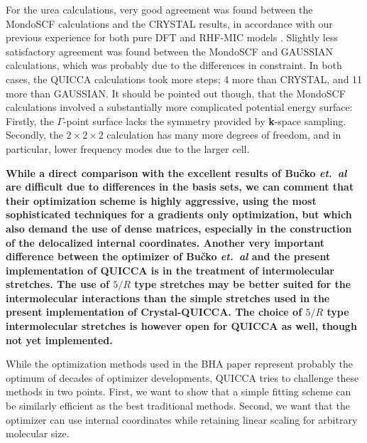 \twolinestyle{\documentclass[prb,preprint]{revtex4}}
\begin{document}
For the urea calculations, very good agreement was found between the 
{\sc MondoSCF} calculations and the {\sc CRYSTAL} results, in accordance 
with our previous experience for both pure DFT \cite{CTymczak05a} and RHF-MIC models \cite{CTymczak05b}.  
Slightly less satisfactory agreement was found between the {\sc MondoSCF} and 
{\sc GAUSSIAN} calculations, which was probably due to the differences in 
constraint.  In both cases, the QUICCA calculations took more steps; 
4 more than {\sc CRYSTAL}, and 11 more than {\sc GAUSSIAN}.  It should
be pointed out though, that the {\sc MondoSCF} calculations involved 
a substantially more complicated potential energy surface:  Firstly, 
the $\Gamma$-point surface lacks the symmetry provided by {\bf k}-space
sampling.  Secondly, the $2\times2\times2$ calculation has many more 
degrees of freedom, and in particular, lower frequency modes due to the 
larger cell.  

{\bf  While a direct comparison with the excellent results of  Bu\v{c}ko 
{\em et.~al} \cite{TBucko05} are difficult due to differences in the basis sets, we can comment that 
their optimization scheme is highly aggressive, using the most sophisticated
techniques for a gradients only optimization, but which also demand the use of 
dense matrices, especially in the construction of the delocalized internal coordinates. 
Another very important difference between the optimizer of Bu\v{c}ko {\em et.~al}
and the present implementation of QUICCA is in the treatment of intermolecular
stretches. The use of $5/R$ type stretches may be better suited
for the intermolecular interactions than the simple stretches used in
the present implementation of Crystal-QUICCA. The choice of $5/R$ type
intermolecular stretches is however open for QUICCA 
as well, though not yet implemented.

While the optimization methods used in the BHA paper represent
probably the optimum of decades of optimizer developments, QUICCA
tries to challenge these methods in two points. First,
we want to show that a simple fitting scheme can be similarly
efficient as the best traditional methods. Second, we want that the 
optimizer can use internal coordinates while retaining linear scaling
for arbitrary molecular size.
}
\end{document}
